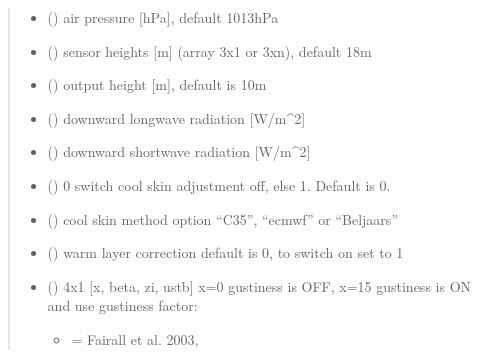 \documentclass[letterpaper,10pt,english]{sphinxmanual}
\begin{document}
\begin{fulllineitems}
\begin{quote}
\begin{description}
\begin{itemize}
\begin{itemize}
\item {}
\sphinxAtStartPar
x=’Td’ : dew point temperature {[}K{]} (will convert if \textless{} 200 and ‘convert’ is
True)

\end{itemize}


\item {}
\sphinxAtStartPar
{} () \textendash{} air pressure {[}hPa{]}, default 1013hPa

\item {}
\sphinxAtStartPar
{} () \textendash{} sensor heights {[}m{]} (array 3x1 or 3xn), default 18m

\item {}
\sphinxAtStartPar
{} () \textendash{} output height {[}m{]}, default is 10m

\item {}
\sphinxAtStartPar
{} () \textendash{} downward longwave radiation {[}W/m\textasciicircum{}2{]}

\item {}
\sphinxAtStartPar
{} () \textendash{} downward shortwave radiation {[}W/m\textasciicircum{}2{]}

\item {}
\sphinxAtStartPar
{} () \textendash{} 0 switch cool skin adjustment off, else 1. Default is 0.

\item {}
\sphinxAtStartPar
{} () \textendash{} cool skin method option “C35”, “ecmwf” or “Beljaars”

\item {}
\sphinxAtStartPar
{} () \textendash{} warm layer correction default is 0, to switch on set to 1

\item {}
\sphinxAtStartPar
{} () \textendash{}
\sphinxAtStartPar
4x1 {[}x, beta, zi, ustb{]} x=0 gustiness is OFF, x=1\sphinxhyphen{}5 gustiness is ON
and use gustiness factor:
\begin{itemize}
\item {}
 = Fairall et al. 2003,


\end{itemize}
\end{itemize}
\end{description}
\end{quote}
\end{fulllineitems}
\end{document}
